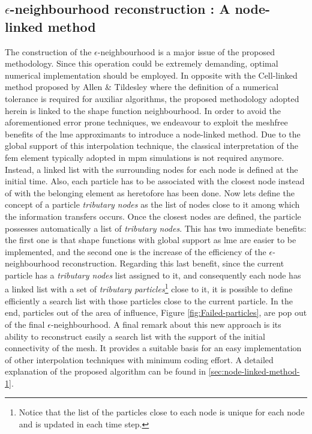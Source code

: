 \documentclass[preprint,12pt,a4paper]{elsarticle}
\begin{document}
\subsection{$\epsilon$-neighbourhood reconstruction : A node-linked method}
\label{sec:epsil-neighb-reconst}
The construction of the $\epsilon$-neighbourhood is a major issue of the proposed methodology. Since this operation could be extremely demanding, optimal
numerical implementation should be employed. In opposite with the Cell-linked
method proposed by Allen \& Tildesley \cite{Allen_et_al_1989} where
the definition of a numerical tolerance is required for auxiliar
algorithms, the proposed methodology adopted herein is linked to the shape function neighbourhood. In order to avoid the aforementioned error prone
techniques, we endeavour to exploit the meshfree benefits of
the \acrshort{lme} approximants to introduce a node-linked method. Due
to the global support of this interpolation technique, the classical
interpretation of the \acrshort{fem} element typically adopted in
\acrshort{mpm} simulations is not required anymore. Instead, a linked
list with the surrounding nodes for each node is defined at the initial
time. Also, each particle has to be associated with the
closest node instead of with the belonging element as heretofore has been
done.
Now lets define the concept of a particle \textit{tributary nodes} as the
list of nodes close to it among which the information transfers
occurs. Once the closest nodes are defined, the particle
possesses automatically a list of \textit{tributary nodes}. This has two
immediate benefits: the first one is that shape functions with global
support as \acrshort{lme} are easier to be implemented,
and the second one is the increase of the efficiency of the $\epsilon$-neighbourhood
reconstruction. Regarding this last benefit, since the current
particle has a \textit{tributary nodes} list assigned to it, and
consequently each node has a linked list with a set of
\textit{tributary particles}\footnote{Notice that the list of the
  particles close to each node is unique for each node and is updated
  in each time step.} close to it, it is possible to define efficiently a
search list with those particles close to the current particle.
In the end, particles out of the area of influence, Figure
\ref{fig:Failed-particles}, are pop out of the final
$\epsilon$-neighbourhood. A final remark about this new approach is
its ability to reconstruct easily a search list with the support of
the initial connectivity of the mesh. It provides a suitable basis for
an easy implementation of other interpolation techniques with minimum
coding effort. A detailed explanation of the proposed algorithm can be
found in \ref{sec:node-linked-method-1}.
\end{document}
